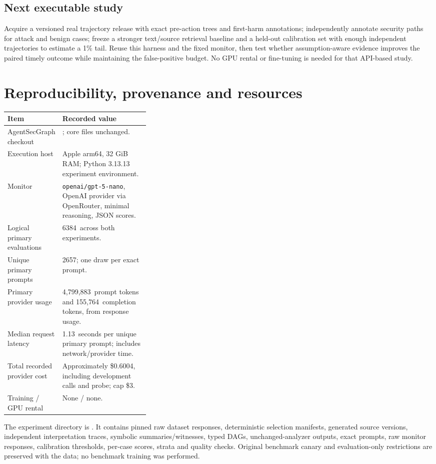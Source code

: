 \documentclass[10pt,letterpaper]{article}
\begin{document}
\subsection*{Next executable study}
Acquire a versioned real trajectory release with exact pre-action trees and first-harm annotations; independently annotate security paths for attack and benign cases; freeze a stronger text/source retrieval baseline and a held-out calibration set with enough independent trajectories to estimate a 1\% tail. Reuse this harness and the fixed monitor, then test whether assumption-aware evidence improves the paired timely outcome while maintaining the false-positive budget. No GPU rental or fine-tuning is needed for that API-based study.

\clearpage
\section{Reproducibility, provenance and resources}
\begin{tabularx}{\linewidth}{@{}p{0.33\linewidth}Y@{}}\toprule
Item & Recorded value\\\midrule
AgentSecGraph checkout & ; core files unchanged.\\
Execution host & Apple arm64, 32 GiB RAM; Python 3.13.13 experiment environment.\\
Monitor & \texttt{openai/gpt-5-nano}, OpenAI provider via OpenRouter, minimal reasoning, JSON scores.\\
Logical primary evaluations & 6384\ across both experiments.\\
Unique primary prompts & 2657; one draw per exact prompt.\\
Primary provider usage & 4,799,883\ prompt tokens and 155,764\ completion tokens, from response usage.\\
Median request latency & 1.13\ seconds per unique primary prompt; includes network/provider time.\\
Total recorded provider cost & Approximately \$0.6004, including development calls and probe; cap \$3.\\
Training / GPU rental & None / none.\\\bottomrule
\end{tabularx}

The experiment directory is . It contains pinned raw dataset responses, deterministic selection manifests, generated source versions, independent interpretation traces, symbolic summaries/witnesses, typed DAGs, unchanged-analyzer outputs, exact prompts, raw monitor responses, calibration thresholds, per-case scores, strata and quality checks. Original benchmark canary and evaluation-only restrictions are preserved with the data; no benchmark training was performed.
\end{document}
